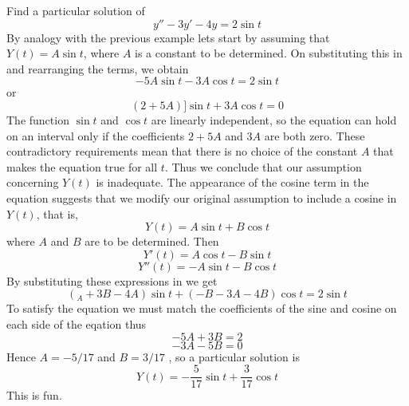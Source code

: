 \begin{example}
	Find a particular solution of \[ y'' - 3y' -4y = 2 \sin t  \] By analogy with the previous example lets start by assuming that $ Y(t) = A \sin t $, where $ A $ is a constant to be determined. On substituting this in and rearranging the terms, we obtain \[ -5A \sin t - 3 A \cos t = 2 \sin t \] or \[ (2+5A) ] \sin t + 3 A \cos t = 0 \] 
	The function $ \sin t $ and $ \cos t $ are linearly independent, so the equation can hold on an interval only if the coefficients $ 2 + 5A $ and $ 3A $ are both zero. These contradictory requirements mean that there is no choice of the constant $ A $ that makes the equation true for all $ t $. Thus we conclude that our assumption concerning $ Y(t) $ is inadequate. The appearance of the cosine term in the equation suggests that we modify our original assumption to include a cosine in $ Y(t) $, that is, \[ Y(t) = A \sin t  + B \cos t \] where $ A  $ and $ B $ are to be determined. Then 
	\[ Y'(t) = A \cos t - B \sin t \] 
	\[ Y''(t) = - A \sin t  - B \cos t \] 
	By substituting these expressions in we get 
	\[ (_A + 3B -4A) \sin t + (-B - 3A - 4B) \cos t = 2 \sin t \] To satisfy the equation we must match the coefficients of the sine and cosine on each side of the eqation thus 
	\[ -5A + 3B = 2  \] \[ -3A -5B = 0 \]
	Hence $ A = -5/17 $ and $ B = 3/17 $ , so a particular solution is 
	\[ Y(t) = -\dfrac{5}{17} \sin t + \dfrac{3}{17} \cos t\] This is fun. 
\end{example}
